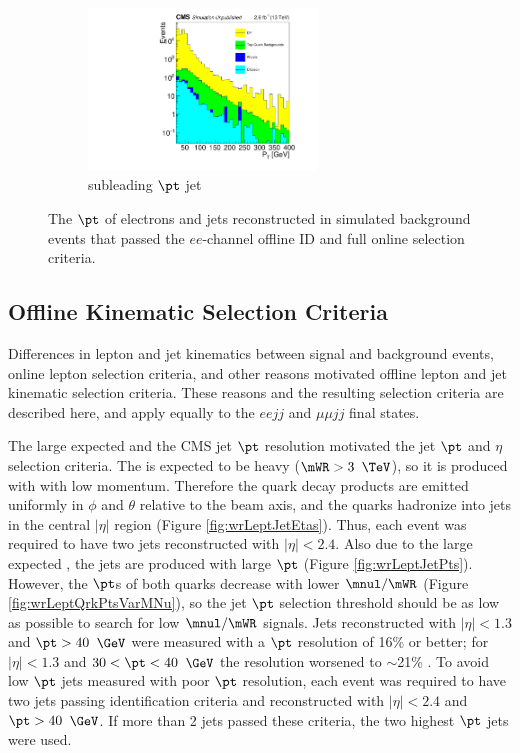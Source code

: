 \begin{figure}
\begin{subfigure}[t]{2.4in}
		\centering
		\includegraphics[width=2.4in]{figures/j2_pt_LooseSelection_TwoLeptsAndJets_EEChannelBkgndMC_log.pdf}
		\caption{subleading $\pt$ jet}\label{fig:bkgLeptJetPtsd}
	\end{subfigure}
	\caption{The $\pt$ of electrons and jets reconstructed in simulated background events that passed the $ee$-channel offline ID and 
	full online selection criteria.}\label{fig:bkgLeptJetPts}
\end{figure}


\subsection{Offline Kinematic Selection Criteria}
Differences in lepton and jet kinematics between signal and background events, online lepton selection criteria, and other reasons 
motivated offline lepton and jet kinematic selection criteria.  These reasons and the resulting selection criteria are described here, 
and apply equally to the $eejj$ and $\mu\mu jj$ final states.

The large expected \mWR and the CMS jet $\pt$ resolution motivated the jet $\pt$ and $\eta$ selection criteria.  The \WR is 
expected to be heavy ($\mWR > 3$ $\TeV$), so it is produced with with low momentum.  Therefore the \WR quark decay products are emitted 
uniformly in $\phi$ and $\theta$ relative to the beam axis, and the quarks hadronize into jets in the central $|\eta|$ 
region (Figure \ref{fig:wrLeptJetEtas}).  Thus, each event was required to have two jets reconstructed with $|\eta| < 2.4$.  Also due to 
the large expected \mWR, the jets are produced with large $\pt$ (Figure \ref{fig:wrLeptJetPts}).  However, the $\pt$s of both \WR quarks 
decrease with lower $\mnul/\mWR$ (Figure \ref{fig:wrLeptQrkPtsVarMNu}), so the jet $\pt$ selection threshold should be as low as possible 
to search for low $\mnul/\mWR$ signals.  Jets reconstructed with $|\eta| < 1.3$ and $\pt > 40$ $\GeV$ were measured 
with a $\pt$ resolution of 16\% or better; for $|\eta| < 1.3$ and $30 < \pt < 40$ $\GeV$ the resolution worsened to $\sim$21\% 
\cite{jetResolutionInCollisions}.  To avoid low $\pt$ jets measured with poor $\pt$ resolution, each event was required to have two 
jets passing identification criteria and reconstructed with $|\eta| < 2.4$ and $\pt > 40$ $\GeV$.  If more than 2 jets passed these 
criteria, the two highest $\pt$ jets were used.

